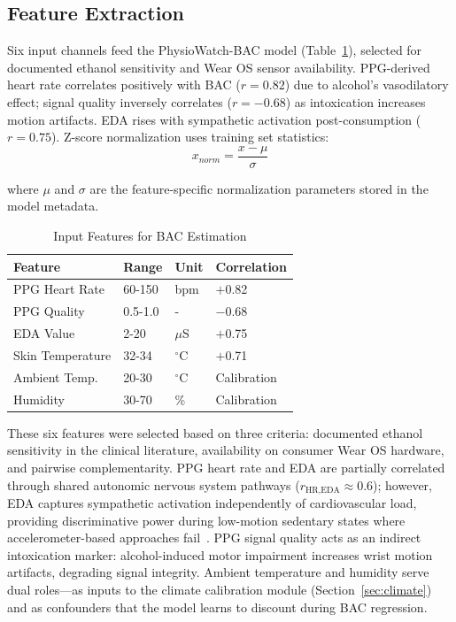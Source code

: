 \documentclass[HARVARD,Times2COL]{WileyNJDv5}
\begin{document}
\subsection{Feature Extraction}
Six input channels feed the PhysioWatch-BAC model (Table~\ref{tab:features}), selected for documented ethanol sensitivity and Wear OS sensor availability. PPG-derived heart rate correlates positively with BAC ($r=0.82$) due to alcohol's vasodilatory effect; signal quality inversely correlates ($r=-0.68$) as intoxication increases motion artifacts. EDA rises with sympathetic activation post-consumption ($r=0.75$). Z-score normalization uses training set statistics: \begin{equation}
x_{norm} = \frac{x - \mu}{\sigma}
\end{equation}

where $\mu$ and $\sigma$ are the feature-specific normalization parameters stored in the model metadata.

\begin{table}[htbp]
\caption{Input Features for BAC Estimation}
\label{tab:features}
\centering
\small
\begin{tabular}{@{}llll@{}}
\toprule
\textbf{Feature} & \textbf{Range} & \textbf{Unit} & \textbf{Correlation} \\
\midrule
PPG Heart Rate & 60-150 & bpm & $+$0.82 \\
PPG Quality & 0.5-1.0 & - & $-$0.68 \\
EDA Value & 2-20 & $\mu$S & $+$0.75 \\
Skin Temperature & 32-34 & $^\circ$C & $+$0.71 \\
Ambient Temp. & 20-30 & $^\circ$C & Calibration \\
Humidity & 30-70 & \% & Calibration \\
\bottomrule
\end{tabular}
\end{table}


These six features were selected based on three criteria: documented ethanol sensitivity in the clinical literature, availability on consumer Wear OS hardware, and pairwise complementarity. PPG heart rate and EDA are partially correlated through shared autonomic nervous system pathways ($r_{\text{HR,EDA}} \approx 0.6$); however, EDA captures sympathetic activation independently of cardiovascular load, providing discriminative power during low-motion sedentary states where accelerometer-based approaches fail~\citep{mejia2024}. PPG signal quality acts as an indirect intoxication marker: alcohol-induced motor impairment increases wrist motion artifacts, degrading signal integrity. Ambient temperature and humidity serve dual roles---as inputs to the climate calibration module (Section~\ref{sec:climate}) and as confounders that the model learns to discount during BAC regression.
\end{document}
